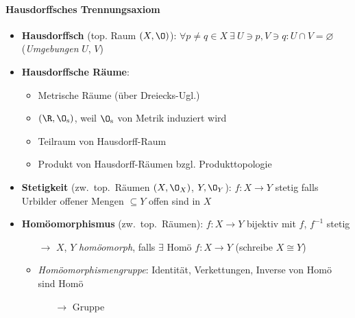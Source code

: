 \paragraph{Hausdorffsches Trennungsaxiom}
\begin{itemize}
  \item \textbf{Hausdorffsch} (top. Raum \( (X, \O) \)): \( \forall p \neq q \in X \ \exists \  U \ni p, V \ni q : U \cap V = \varnothing \) (\emph{Umgebungen} \( U \), \( V \)) 
  \item \textbf{Hausdorffsche Räume}:
  \begin{itemize}
    \item Metrische Räume (über Dreiecks-Ugl.)
    \item \( (\R, \O_{\text{s}}) \), weil \( \O_{\text{s}} \) von Metrik induziert wird
    \item Teilraum von Hausdorff-Raum
    \item Produkt von Hausdorff-Räumen bzgl. Produkttopologie
  \end{itemize}
  \item \textbf{Stetigkeit} (zw.\ top.\ Räumen \( (X,\O_X) \), \( Y, \O_Y \)): \( f: X \to Y \) stetig falls Urbilder offener Mengen \( \subseteq Y \) offen sind in \( X \)
  \item \textbf{Homöomorphismus} (zw.\ top.\ Räumen): \( f: X \to Y \) bijektiv mit \( f \), \( f^{-1} \) stetig
  \begin{itemize}
    \item[\( \to \)] \( X \), \( Y \) \emph{homöomorph}, falls \( \exists \) Homö \( f: X \to Y \) (schreibe \( X \cong Y \))
    \item \emph{Homöomorphismengruppe}: Identität, Verkettungen, Inverse von Homö sind Homö
    \begin{itemize}
      \item[\( \to \)] Gruppe
    \end{itemize}
  \end{itemize}
  
\end{itemize}
